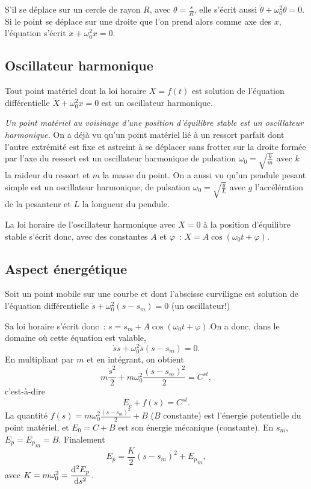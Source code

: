 S'il se déplace sur un cercle de rayon \(R\), avec \(\theta=\frac{s}{R}\), elle 
s'écrit aussi \(\ddot{\theta}+\omega_0^2\theta=0\). Si le point se déplace sur 
une droite que l'on prend alors comme axe des \(x\), l'équation s'écrit 
\(\ddot{x}+\omega_0^2x = 0\).

\subsection{Oscillateur harmonique}%
\label{chap5-subsec:oscillateur}%

Tout point matériel dont la loi horaire \(X=f(t)\) est solution de l'équation 
différentielle \(\ddot{X}+\omega_0^2x=0\) est un oscillateur harmonique.

\emph{Un point matériel au voisinage d'une position d'équilibre stable est un 
oscillateur harmonique.} On a déjà vu qu'un point matériel lié à un ressort 
parfait dont l'autre extrémité est fixe et astreint à se déplacer sans frotter 
sur la droite formée par l'axe du ressort est un oscillateur harmonique de 
pulsation \(\omega_0=\sqrt{\frac{k}{m}}\) avec \(k\) la raideur du ressort et 
\(m\) la masse du point. On a aussi vu qu'un pendule pesant simple est un 
oscillateur harmonique, de pulsation \(\omega_0=\sqrt{\frac{g}{L}}\) avec \(g\) 
l'accélération de la pesanteur et \(L\) la longueur du pendule.%

La loi horaire de l'oscillateur harmonique avec \(X=0\) à la position 
d'équilibre stable s'écrit donc, avec des constantes \(A\) et \(\varphi\)~: 
\(X=A\cos(\omega_0 t +\varphi)\).

\subsection{Aspect énergétique}%
\label{chap5-subsec:aspectenergetique}%

Soit un point mobile sur une courbe et dont l'abscisse curviligne est solution 
de l'équation différentielle \(\ddot{s} +\omega_0^2(s-s_m)=0\) (un oscillateur!)

Sa loi horaire s'écrit donc~: \(s=s_m + A\cos(\omega_0 t+\varphi)\).On a donc,
dans le domaine où cette équation est valable,
\begin{equation}%
 \dot{s}\ddot{s} +\omega_0^2\dot{s}(s-s_m)=0.
\end{equation}%
En multipliant par \(m\) et en intégrant, on obtient
\begin{equation}%
  m \frac{\dot{s}^2}{2} + m\omega_0^2\frac{(s-s_m)^2}{2} = C^{st},
\end{equation}%
c'est-à-dire
\begin{equation}%
  E_c +f(s) = C^{st}.
\end{equation}%
La quantité \(f(s)=m\omega_0^2\frac{(s-s_m)^2}{2}+B\) (\(B\) constante) est 
l'énergie potentielle du point matériel, et \(E_0=C+B\) est son énergie 
mécanique (constante). En \(s_m\), \(E_p={E_p}_m=B\). Finalement
\begin{equation}%
  E_p = \frac{K}{2}(s-s_m)^2+{E_p}_m ,
\end{equation}%
avec \(K=m\omega_0^2=\dfrac{\mathrm{d}^2 E_p}{\mathrm{d} {s}^2}\).

